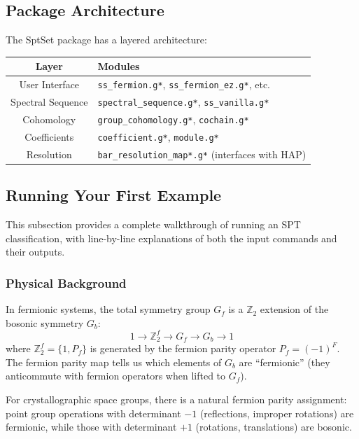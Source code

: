 \documentclass{SciPost}
\begin{document}
\subsection{Package Architecture}

The SptSet package has a layered architecture:

\begin{center}
\begin{tabular}{|c|l|}
\hline
\textbf{Layer} & \textbf{Modules} \\
\hline
User Interface & \texttt{ss\_fermion.g*}, \texttt{ss\_fermion\_ez.g*}, etc. \\
\hline
Spectral Sequence & \texttt{spectral\_sequence.g*}, \texttt{ss\_vanilla.g*} \\
\hline
Cohomology & \texttt{group\_cohomology.g*}, \texttt{cochain.g*} \\
\hline
Coefficients & \texttt{coefficient.g*}, \texttt{module.g*} \\
\hline
Resolution & \texttt{bar\_resolution\_map*.g*} (interfaces with HAP) \\
\hline
\end{tabular}
\end{center}

\subsection{Running Your First Example}
\label{subsec:first-example}

This subsection provides a complete walkthrough of running an SPT classification, with line-by-line explanations of both the input commands and their outputs.

\subsubsection{Physical Background}

In fermionic systems, the total symmetry group $G_f$ is a $\mathbb{Z}_2$ extension of the bosonic symmetry $G_b$:
\begin{equation}
1 \to \mathbb{Z}_2^f \to G_f \to G_b \to 1
\end{equation}
where $\mathbb{Z}_2^f = \{1, P_f\}$ is generated by the fermion parity operator $P_f = (-1)^F$. The fermion parity map tells us which elements of $G_b$ are ``fermionic'' (they anticommute with fermion operators when lifted to $G_f$).

For crystallographic space groups, there is a natural fermion parity assignment: point group operations with determinant $-1$ (reflections, improper rotations) are fermionic, while those with determinant $+1$ (rotations, translations) are bosonic.
\end{document}
